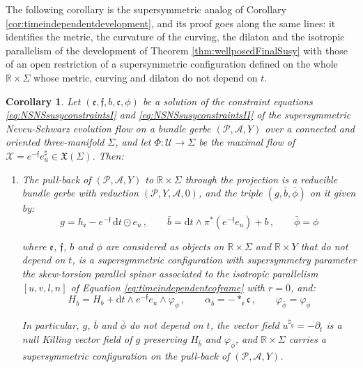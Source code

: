 \documentclass[10pt,reqno,a4paper]{amsart}
\theoremstyle{plain}
\newtheorem{cor}[thm]{Corollary}
\theoremstyle{definition}
\theoremstyle{remark}
\theoremstyle{remark}
\def\dd{\mathrm{d}}
\def\cA{\mathcal{A}}
\def\cP{\mathcal{P}}
\def\cX{\mathcal{X}}
\def\frc{\mathfrak{c}}
\def\cU{\mathcal{U}}
\def\fre{\mathfrak{e}}
\renewcommand{\(}{ (}
\renewcommand{\)}{ )}
\newcommand{\frf}{\mathfrak{f}}
\begin{document}
\noindent 
The following corollary is the supersymmetric analog of Corollary \ref{cor:timeindependentdevelopment}, and its proof goes along the same lines: it identifies the metric, the curvature of the curving, the dilaton and the isotropic parallelism of the development of Theorem \ref{thm:wellposedFinalSusy} with those of an open restriction of a supersymmetric configuration defined on the whole $\mathbb{R}\times\Sigma$ whose metric, curving and dilaton do not depend on $t$.

\begin{cor}
\label{cor:timeindependentsusydevelopment}
Let $(\fre,\frf,b,\frc,\phi)$ be a solution of the constraint equations \eqref{eq:NSNSsusyconstraintsI} and \eqref{eq:NSNSsusyconstraintsII} of the supersymmetric Neveu-Schwarz evolution flow on a bundle gerbe $(\cP,\cA,Y)$ over a connected and oriented three-manifold $\Sigma$, and let $\Phi\colon \cU\to\Sigma$ be the maximal flow of $\cX = e^{-\frf}e^{\sharp}_u\in\mathfrak{X}(\Sigma)$. Then:
\begin{enumerate}
\item The pull-back of $(\cP,\cA,Y)$ to $\mathbb{R}\times\Sigma$ through the projection is a reducible bundle gerbe with reduction $(\cP,Y,\cA,0)$, and the triple $(g,\bar{b},\bar{\phi})$ on it given by:
\begin{equation}
\label{eq:timeindependentsusyconfiguration}
g = h_{\fre} - e^{-\frf}\, \dd t\odot e_u\, , \qquad \bar{b} = \dd t\wedge \pi^{\ast}(e^{-\frf}e_u) + b\, , \qquad \bar{\phi} = \phi
\end{equation}

\noindent
where $\fre$, $\frf$, $b$ and $\phi$ are considered as objects on $\mathbb{R}\times\Sigma$ and $\mathbb{R}\times Y$ that do not depend on $t$, is a supersymmetric configuration with supersymmetry parameter the skew-torsion parallel spinor associated to the isotropic parallelism $[u,v,l,n]$ of Equation \eqref{eq:timeindependentcoframe} with $r = 0$, and:
\begin{equation}
\label{eq:timeindependentsusyflux}
H_{\bar{b}} = H_b + \dd t\wedge e^{-\frf}e_u\wedge\varphi_{\phi}\, , \qquad \alpha_{\bar{b}} = -\ast_{\fre}\frc\, , \qquad \varphi_{\bar{\phi}} = \varphi_{\phi}
\end{equation}

\noindent
In particular, $g$, $\bar{b}$ and $\bar{\phi}$ do not depend on $t$, the vector field $u^{\sharp_g} = -\partial_t$ is a null Killing vector field of $g$ preserving $H_{\bar{b}}$ and $\varphi_{\bar{\phi}}$, and $\mathbb{R}\times\Sigma$ carries a supersymmetric configuration on the pull-back of $(\cP,\cA,Y)$.


\end{enumerate}
\end{cor}
\end{document}
